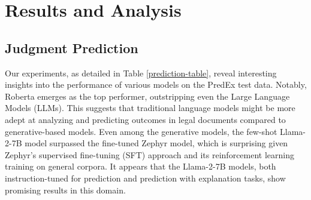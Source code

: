 \section{Results and Analysis}

\subsection{Judgment Prediction}
Our experiments, as detailed in Table \ref{prediction-table}, reveal interesting insights into the performance of various models on the PredEx test data. Notably, Roberta emerges as the top performer, outstripping even the Large Language Models (LLMs). This suggests that traditional language models might be more adept at analyzing and predicting outcomes in legal documents compared to generative-based models. Even among the generative models, the few-shot Llama-2-7B model surpassed the fine-tuned Zephyr model, which is surprising given Zephyr's supervised fine-tuning (SFT) approach and its reinforcement learning training on general corpora. It appears that the Llama-2-7B models, both instruction-tuned for prediction and prediction with explanation tasks, show promising results in this domain.


